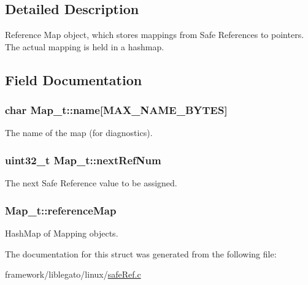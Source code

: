 \subsection{Detailed Description}
Reference Map object, which stores mappings from Safe References to pointers. The actual mapping is held in a hashmap. 

\subsection{Field Documentation}
\subsubsection[{\texorpdfstring{name}{name}}]{\setlength{\rightskip}{0pt plus 5cm}char Map\+\_\+t\+::name\mbox{[}{\bf M\+A\+X\+\_\+\+N\+A\+M\+E\+\_\+\+B\+Y\+T\+ES}\mbox{]}}\hypertarget{struct_map__t_af2b75dd4063f7b7fdfc94fb6df01d194}{}\label{struct_map__t_af2b75dd4063f7b7fdfc94fb6df01d194}


The name of the map (for diagnostics). 

\subsubsection[{\texorpdfstring{next\+Ref\+Num}{nextRefNum}}]{\setlength{\rightskip}{0pt plus 5cm}uint32\+\_\+t Map\+\_\+t\+::next\+Ref\+Num}\hypertarget{struct_map__t_ade5c144406b95d07307637ead975d0bc}{}\label{struct_map__t_ade5c144406b95d07307637ead975d0bc}


The next Safe Reference value to be assigned. 

\subsubsection[{\texorpdfstring{reference\+Map}{referenceMap}}]{ Map\+\_\+t\+::reference\+Map}\hypertarget{struct_map__t_a3c5e1ea038445888d1d690692d454006}{}\label{struct_map__t_a3c5e1ea038445888d1d690692d454006}


Hash\+Map of Mapping objects. 



The documentation for this struct was generated from the following file\+:\begin{DoxyCompactItemize}
\item 
framework/liblegato/linux/\hyperlink{safe_ref_8c}{safe\+Ref.\+c}\end{DoxyCompactItemize}
